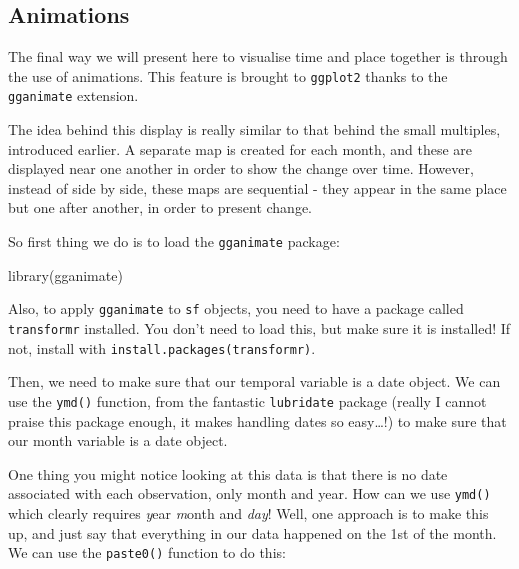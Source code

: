 \documentclass[
]{book}
\makeatletter
\newenvironment{Shaded}{\begin{snugshade}}{\end{snugshade}}
\newcommand{\FunctionTok}[1]{\textcolor[rgb]{0,0,0}{#1}}
\newcommand{\NormalTok}[1]{#1}
\newcommand{\OtherTok}[1]{\textcolor[rgb]{0.37,0.37,0.37}{#1}}
\newcommand{\SpecialCharTok}[1]{\textcolor[rgb]{0,0,0}{#1}}
\newcommand{\StringTok}[1]{\textcolor[rgb]{0.5,0.5,0.5}{#1}}
\newenvironment{kframe}{%
\medskip{}
\setlength{\fboxsep}{.8em}
 \def\at@end@of@kframe{}%
 \ifinner\ifhmode%
  \def\at@end@of@kframe{\end{minipage}}%
  \begin{minipage}{\columnwidth}%
 \fi\fi%
 \def\FrameCommand##1{\hskip\@totalleftmargin \hskip-\fboxsep
 \colorbox{shadecolor}{##1}\hskip-\fboxsep
     \hskip-\linewidth \hskip-\@totalleftmargin \hskip\columnwidth}%
 \MakeFramed {\advance\hsize-\width
   \@totalleftmargin\z@ \linewidth\hsize
   \@setminipage}}%
 {\par\unskip\endMakeFramed%
 \at@end@of@kframe}
\renewenvironment{Shaded}{\begin{kframe}}{\end{kframe}}
\makeatother
\begin{document}
\hypertarget{animations}{%
\subsection{Animations}\label{animations}}

The final way we will present here to visualise time and place together is through the use of animations. This feature is brought to \texttt{ggplot2} thanks to the \texttt{gganimate} extension.

The idea behind this display is really similar to that behind the small multiples, introduced earlier. A separate map is created for each month, and these are displayed near one another in order to show the change over time. However, instead of side by side, these maps are sequential - they appear in the same place but one after another, in order to present change.

So first thing we do is to load the \texttt{gganimate} package:

\begin{Shaded}
\begin{Highlighting}[]
\FunctionTok{library}\NormalTok{(gganimate)}
\end{Highlighting}
\end{Shaded}

Also, to apply \texttt{gganimate} to \texttt{sf} objects, you need to have a package called \texttt{transformr} installed. You don't need to load this, but make sure it is installed! If not, install with \texttt{install.packages(transformr)}.

Then, we need to make sure that our temporal variable is a date object. We can use the \texttt{ymd()} function, from the fantastic \texttt{lubridate} package (really I cannot praise this package enough, it makes handling dates so easy\ldots!) to make sure that our month variable is a date object.

One thing you might notice looking at this data is that there is no date associated with each observation, only month and year. How can we use \texttt{ymd()} which clearly requires \emph{y}ear \emph{m}onth and \emph{day}! Well, one approach is to make this up, and just say that everything in our data happened on the 1st of the month. We can use the \texttt{paste0()} function to do this:

\begin{Shaded}
\end{Shaded}
\end{document}

